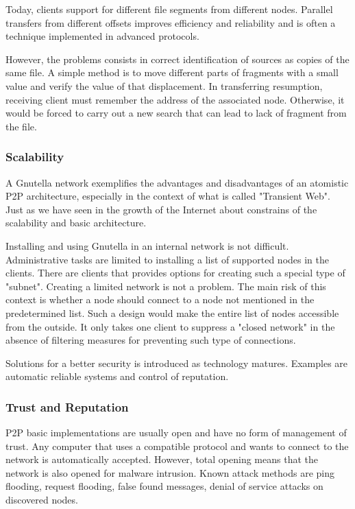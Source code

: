 Today, clients support for different file segments from different nodes.
Parallel transfers from different offsets improves efficiency and reliability
and is often a technique implemented in advanced protocols.

However, the problems consists in correct identification of sources as copies
of the same file. A simple method is to move different parts of fragments with
a small value and verify the value of that displacement. In transferring
resumption, receiving client must remember the address of the associated node.
Otherwise, it would be forced to carry out a new search that can lead to
lack of fragment from the file.

\subsubsection{Scalability}

A Gnutella network exemplifies the advantages and disadvantages of an atomistic
P2P architecture, especially in the context of what is called "Transient Web".
Just as we have seen in the growth of the Internet about constrains of
the scalability and basic architecture.

Installing and using Gnutella in an internal network is not difficult.
Administrative tasks are limited to installing a list of supported nodes in the
clients. There are clients that provides options for creating such a special
type of "subnet".  Creating a limited network is not a problem. The main risk
of this context is whether a node should connect to a node not mentioned in the
predetermined list. Such a design would make the entire list of nodes accessible
from the outside. It only takes one client to suppress a "closed network" in the
absence of filtering measures for preventing such type of connections.

Solutions for a better security is introduced as technology matures. Examples
are automatic reliable systems and control of reputation.

\subsubsection{Trust and Reputation}

P2P basic implementations are usually open and have no form of management of
trust. Any computer that uses a compatible protocol and wants to connect to the
network is automatically accepted. However, total opening means that the network
is also opened for malware intrusion. Known attack methods are ping flooding,
request flooding, false found messages, denial of service attacks on discovered
nodes.

